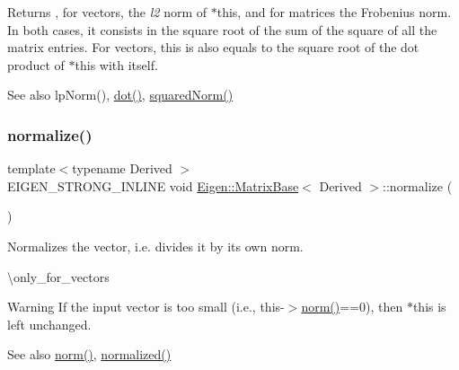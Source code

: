 \begin{DoxyReturn}{Returns}
, for vectors, the {\itshape l2} norm of {\ttfamily $\ast$this}, and for matrices the Frobenius norm. In both cases, it consists in the square root of the sum of the square of all the matrix entries. For vectors, this is also equals to the square root of the dot product of {\ttfamily $\ast$this} with itself.
\end{DoxyReturn}
\begin{DoxySeeAlso}{See also}
lp\+Norm(), \mbox{\hyperlink{class_eigen_1_1_matrix_base_a2c84258ecc93fc1a0a2d4fa22b99dd99}{dot()}}, \mbox{\hyperlink{class_eigen_1_1_matrix_base_a8782faeb21e43908cdce47cec06fba23}{squared\+Norm()}} 
\end{DoxySeeAlso}
\mbox{\label{class_eigen_1_1_matrix_base_a1a2dd2fd1597ee6d51098aa3bb7c86f4}} 
\subsubsection{\texorpdfstring{normalize()}{normalize()}}
{\footnotesize\ttfamily template$<$typename Derived $>$ \\
E\+I\+G\+E\+N\+\_\+\+S\+T\+R\+O\+N\+G\+\_\+\+I\+N\+L\+I\+NE void \mbox{\hyperlink{class_eigen_1_1_matrix_base}{Eigen\+::\+Matrix\+Base}}$<$ Derived $>$\+::normalize (\begin{DoxyParamCaption}{ }\end{DoxyParamCaption})}

Normalizes the vector, i.\+e. divides it by its own norm.

\textbackslash{}only\+\_\+for\+\_\+vectors

\begin{DoxyWarning}{Warning}
If the input vector is too small (i.\+e., this-\/$>$\mbox{\hyperlink{class_eigen_1_1_matrix_base_a5f6a3bc46add1f2e879ce15040e6987e}{norm()}}==0), then {\ttfamily $\ast$this} is left unchanged.
\end{DoxyWarning}
\begin{DoxySeeAlso}{See also}
\mbox{\hyperlink{class_eigen_1_1_matrix_base_a5f6a3bc46add1f2e879ce15040e6987e}{norm()}}, \mbox{\hyperlink{class_eigen_1_1_matrix_base_a6ede5c8ebe9631fed9004fedbf9e4016}{normalized()}} 
\end{DoxySeeAlso}
\mbox{\label{class_eigen_1_1_matrix_base_a6ede5c8ebe9631fed9004fedbf9e4016}} 
